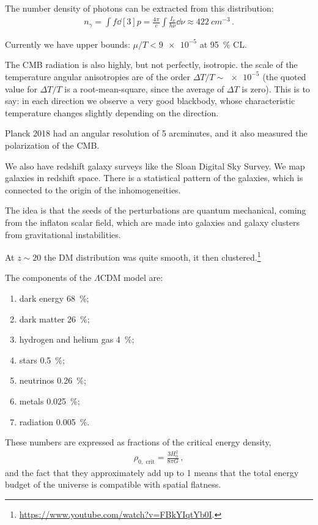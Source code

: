 \documentclass[main.tex]{subfiles}
\begin{document}
The number density of photons can be extracted from this distribution: 
%
\begin{align}
n_\gamma = \int f \dd[3]{p} = \frac{4 \pi }{c} \int \frac{I_\nu}{h \nu } \dd{\nu } \approx \SI{422}{cm^{-3}}
\,.
\end{align}
%

Currently we have upper bounds: \(\mu / T < \num{9e-5}\) at \SI{95}{\percent} CL. 

The CMB radiation is also highly, but not perfectly, isotropic. the scale of the temperature angular anisotropies are of the order \(\Delta T / T \sim \num{e-5}\) (the quoted value for \(\Delta T/T\) is a root-mean-square, since the average of \(\Delta T\) is zero). 
This is to say: in each direction we observe a very good blackbody, whose characteristic temperature changes slightly depending on the direction.

Planck 2018 had an angular resolution of 5 arcminutes, and it also measured the polarization of the CMB. 

We also have redshift galaxy surveys like the Sloan Digital Sky Survey. We map galaxies in redshift space. 
There is a statistical pattern of the galaxies, which is connected to the origin of the inhomogeneities. 

The idea is that the seeds of the perturbations are quantum mechanical, coming from the inflaton scalar field, which are made into galaxies and galaxy clusters from gravitational instabilities.

At \(z \sim 20\) the DM distribution was quite smooth, it then clustered.\footnote{\url{https://www.youtube.com/watch?v=FBkYIqtYb0I}.}

The components of the \(\Lambda \)CDM model are: 
\begin{enumerate}
    \item dark energy \SI{68}{\percent};
    \item dark matter \SI{26}{\percent};
    \item hydrogen and helium gas \SI{4}{\percent};
    \item stars \SI{.5}{\percent};
    \item neutrinos \SI{.26}{\percent};
    \item metals \SI{.025}{\percent};
    \item radiation \SI{.005}{\percent}.
\end{enumerate}

These numbers are expressed as fractions of the critical energy density, 
%
\begin{align}
\rho _{0,\text{ crit}} = \frac{3 H_0^2}{8 \pi G}
\,,
\end{align}
%
and the fact that they approximately add up to 1 means that the total energy budget of the universe is compatible with spatial flatness. 
\end{document}
